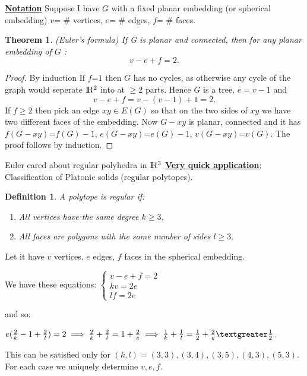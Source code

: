 \documentclass[a4paper]{article}
\theoremstyle{plain}
\newtheorem{theorem}[lemma]{Theorem}
\newtheorem{definition}[lemma]{Definition}
\theoremstyle{myremark}
\begin{document}
\bigskip
\underline{\textbf{Notation}} Suppose I have {$G$} with a fixed planar embedding (or spherical embedding)
\newline
				     {$v$}= \# vertices, {$e$}= \# edges, {$f$}= \# faces.
\begin {theorem}
(Euler's formula) If G is planar and connected, then for any planar embedding of {$G$} :   
$$v-e+f=2.$$
\end {theorem}
\begin {proof}
By induction
\newline
If {$f$}={$1$} then {$G$} has no cycles, as otherwise any cycle of the graph would seperate ${\rm I\!R^2}$ into at $\geq 2$ parts. Hence {$G$} is a tree, $e=v-1$ and
$$v-e+f=v-(v-1)+1=2.$$
If $f\geqslant 2$ then pick an edge $xy\in E(G)$ so that on the two sides of {$xy$} we have two different faces of the embedding.
Now {$G-xy$} is planar, connected and it has 
{$f(G-xy)$}={$f(G)-1$},
{$e(G-xy)$}={$e(G)-1$},
{$v(G-xy)$}={$v(G)$}. 
The proof follows by induction.
\end {proof}
\bigskip
Euler cared about regular polyhedra in ${\rm I\!R^3}$
\newline
\underline{\textbf{Very quick application}}: Classification of Platonic solids (regular polytopes).
\begin {definition} A polytope is regular if:
\begin {enumerate}
\item All vertices have the same degree $k\geqslant3$,
\item All faces are polygons with the same number of sides $l\geqslant3$.
\end {enumerate}
\end {definition}
Let it have {$v$} vertices, {$e$} edges, {$f$} faces in the spherical embedding.

We have these equations:
$\begin{cases}
v-e+f=2\\
kv=2e \\
lf=2e 
\end {cases}$

and so:

$e(\frac{2}{k}-1+\frac{2}{l})=2 \implies \frac{2}{k}+\frac{2}{l}=1+\frac{2}{e}\implies \frac{1}{k}+\frac{1}{l}=\frac{1}{2}+\frac{2}{e}\textgreater \frac{1}{2}$. 

This can be satisfied only for $(k,l)=(3,3),(3,4),(3,5),(4,3),(5,3)$. For each case we uniquely determine $v,e,f$.
\end{document}
